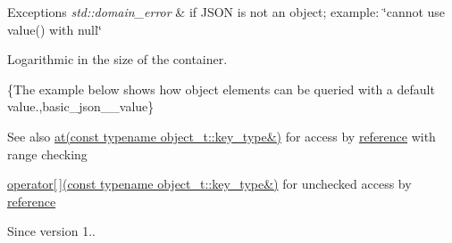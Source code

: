 \begin{DoxyExceptions}{Exceptions}
{\em std\+::domain\+\_\+error} & if J\+S\+ON is not an object; example\+: {\ttfamily \char`\"{}cannot use
value() with null\char`\"{}}\\
\hline
\end{DoxyExceptions}
Logarithmic in the size of the container.

\{The example below shows how object elements can be queried with a default value.,basic\+\_\+json\+\_\+\+\_\+value\}

\begin{DoxySeeAlso}{See also}
\hyperlink{classnlohmann_1_1basic__json_a7ed92d56cb313b243c1917696ffdf074}{at(const typename object\+\_\+t\+::key\+\_\+type\&)} for access by \hyperlink{classnlohmann_1_1basic__json_a3ec8e17be8732fe436e9d6733f52b7a3}{reference} with range checking 

\hyperlink{classnlohmann_1_1basic__json_a92fbb711a36b5ce78ee228b26787c034}{operator\mbox{[}$\,$\mbox{]}(const typename object\+\_\+t\+::key\+\_\+type\&)} for unchecked access by \hyperlink{classnlohmann_1_1basic__json_a3ec8e17be8732fe436e9d6733f52b7a3}{reference}
\end{DoxySeeAlso}
\begin{DoxySince}{Since}
version 1.. 
\end{DoxySince}
\hypertarget{classnlohmann_1_1basic__json_a576ca17f297a7a43200088c24b8437e6}{}\label{classnlohmann_1_1basic__json_a576ca17f297a7a43200088c24b8437e6} 
